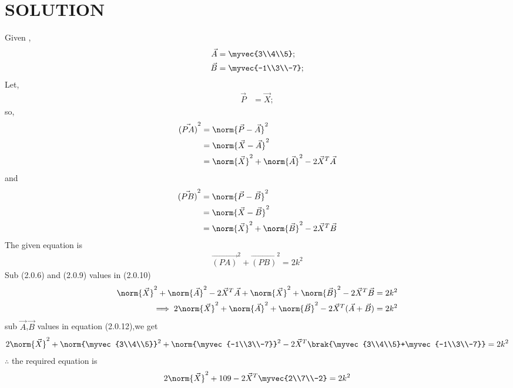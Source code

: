 \documentclass[journal,12pt,twocolumn]{IEEEtran}
\begin{document}
\section{SOLUTION} 
Given ,
\begin{align}
\vec A &=\myvec{3\\4\\5};
  \\
  \vec B &=\myvec{-1\\3\\-7};
\end{align}
Let,
\begin{align}
 \vec P &=\vec{X};
\end{align}
 so,
 \begin{align}
 \vec{(PA)}^2&=\norm{\vec P-\vec A}^2\\
 &=\norm{\vec X-\vec A}^2\\
 &=\norm{\vec X}^2+\norm{\vec A}^2-2\vec X^T\vec A
 \end{align}
 and
 \begin{align}
 \vec{(PB)}^2&=\norm{\vec P-\vec B}^2\\
 &=\norm{\vec X-\vec B}^2\\
 &=\norm{\vec X}^2+\norm{\vec B}^2-2\vec X^T\vec B
 \end{align}
 The given equation is
\begin{align}
 \vec{(PA)}^2+ \vec{(PB)}^2 =2k^2
 \end{align}
 Sub (2.0.6) and (2.0.9) values in (2.0.10)
\begin{align}
\norm{\vec X}^2+\norm{\vec A}^2-2\vec X^T\vec A+\norm{\vec X}^2+\norm{\vec B}^2-2\vec X^T\vec B=2k^2\\
\implies 2\norm{\vec X}^2+\norm{\vec A}^2+\norm{\vec B}^2-2\vec X^T(\vec A+\vec B)=2k^2
\end{align}
sub $\vec A$,$\vec B$ values in equation (2.0.12),we get
\begin{align}
 2\norm{\vec X}^2+\norm{\myvec{3\\4\\5}}^2+\norm{\myvec{-1\\3\\-7}}^2-2\vec X^T\brak{\myvec{3\\4\\5}+\myvec{-1\\3\\-7}}=2k^2
 \end{align}
 $\therefore$ the required equation is
 \begin{align}
  2\norm{\vec X}^2+109-2\vec X^T\myvec{2\\7\\-2}=2k^2
\end{align}
\end{document}
